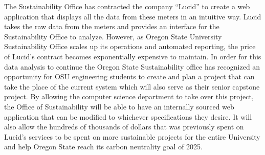 \documentclass[onecolumn, draftclsnofoot,10pt, compsoc]{IEEEtran}
\begin{document}
    \indent The Sustainability Office has contracted the company “Lucid” to create a web application that displays all the data from these meters in an intuitive way. Lucid takes the raw data from the meters and provides an interface for the Sustainability Office to analyze. However, as Oregon State University Sustainability Office scales up its operations and automated reporting, the price of Lucid’s contract becomes exponentially expensive to maintain.  In order for this data analysis to continue the Oregon State Sustainability office has recognized an opportunity for OSU engineering students to create and plan a project that can take the place of the current system which will also serve as their senior capstone project. By allowing the computer science department to take over this project, the Office of Sustainability will be able to have an internally sourced web application that can be modified to whichever specifications they desire. It will also allow the hundreds of thousands of dollars that was previously spent on Lucid’s services to be spent on more sustainable projects for the entire University and help Oregon State reach its carbon neutrality goal of 2025.
    \newpage
\end{document}
